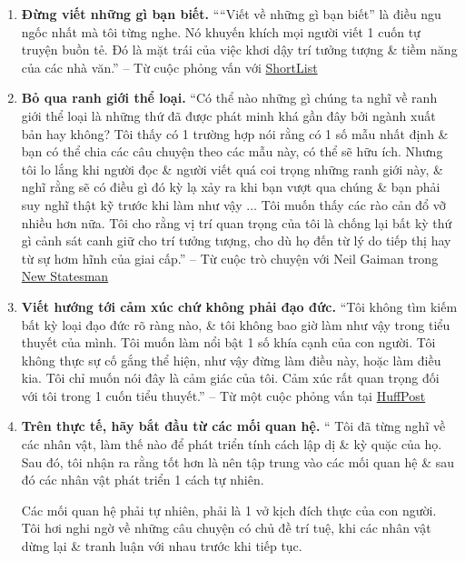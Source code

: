 \documentclass[oneside]{book}
\numberwithin{equation}{section}
\begin{document}
\begin{enumerate}
	\item \textbf{Đừng viết những gì bạn biết.} ````Viết về những gì bạn biết'' là điều ngu ngốc nhất mà tôi từng nghe. Nó khuyến khích mọi người viết 1 cuốn tự truyện buồn tẻ. Đó là mặt trái của việc khơi dậy trí tưởng tượng \& tiềm năng của các nhà văn.'' -- Từ cuộc phỏng vấn với \href{https://www.shortlist.com/entertainment/books/kazuo-ishiguro-talks-zuckerberg-game-of-thrones-and-his-new-novel/97003}{ShortList}
	\item \textbf{Bỏ qua ranh giới thể loại.} ``Có thể nào những gì chúng ta nghĩ về ranh giới thể loại là những thứ đã được phát minh khá gần đây bởi ngành xuất bản hay không? Tôi thấy có 1 trường hợp nói rằng có 1 số mẫu nhất định \& bạn có thể chia các câu chuyện theo các mẫu này, có thể sẽ hữu ích. Nhưng tôi lo lắng khi người đọc \& người viết quá coi trọng những ranh giới này, \& nghĩ rằng sẽ có điều gì đó kỳ lạ xảy ra khi bạn vượt qua chúng \& bạn phải suy nghĩ thật kỹ trước khi làm như vậy $\ldots$ Tôi muốn thấy các rào cản đổ vỡ nhiều hơn nữa. Tôi cho rằng vị trí quan trọng của tôi là chống lại bất kỳ thứ gì cảnh sát canh giữ cho trí tưởng tượng, cho dù họ đến từ lý do tiếp thị hay từ sự hơm hĩnh của giai cấp.'' -- Từ cuộc trò chuyện với Neil Gaiman trong \href{https://www.newstatesman.com/2015/05/neil-gaiman-kazuo-ishiguro-interview-literature-genre-machines-can-toil-they-can-t-imagine}{New Statesman}
	\item \textbf{Viết hướng tới cảm xúc chứ không phải đạo đức.} ``Tôi không tìm kiếm bất kỳ loại đạo đức rõ ràng nào, \& tôi không bao giờ làm như vậy trong tiểu thuyết của mình. Tôi muốn làm nổi bật 1 số khía cạnh của con người. Tôi không thực sự cố gắng thể hiện, như vậy đừng làm điều này, hoặc làm điều kia. Tôi chỉ muốn nói đây là cảm giác của tôi. Cảm xúc rất quan trọng đối với tôi trong 1 cuốn tiểu thuyết.'' -- Từ một cuộc phỏng vấn tại \href{https://www.huffingtonpost.com/2015/03/03/kazuo-ishiguro-interview_n_6785824.html}{HuffPost}
	\item \textbf{Trên thực tế, hãy bắt đầu từ các mối quan hệ.} `` Tôi đã từng nghĩ về các nhân vật, làm thế nào để phát triển tính cách lập dị \& kỳ quặc của họ. Sau đó, tôi nhận ra rằng tốt hơn là nên tập trung vào các mối quan hệ \& sau đó các nhân vật phát triển 1 cách tự nhiên.
	
	Các mối quan hệ phải tự nhiên, phải là 1 vở kịch đích thực của con người. Tôi hơi nghi ngờ về những câu chuyện có chủ đề trí tuệ, khi các nhân vật dừng lại \& tranh luận với nhau trước khi tiếp tục.
	

\end{enumerate}
\end{document}
